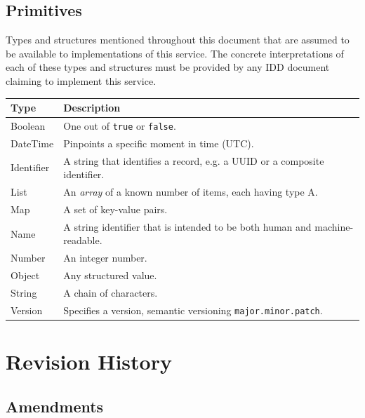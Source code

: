 \documentclass[a4paper]{arrowhead}
\newcommand{\pdef}[1]{{\textcolor{ArrowheadGrey}{#1\label{sec:model:primitives:#1}\label{sec:model:primitives:#1s}\label{sec:model:primitives:#1es}}}}
\begin{document}
\subsection{Primitives}
\label{sec:model:primitives}

Types and structures mentioned throughout this document that are assumed to be available to implementations of this service.
The concrete interpretations of each of these types and structures must be provided by any IDD document claiming to implement this service.

\noindent\begin{tabularx}{\textwidth}{| p{4.6cm} | X |} \hline
\rowcolor{gray!33} Type & Description \\ \hline
\pdef{Boolean} & One out of \texttt{true} or \texttt{false}. \\ \hline
\pdef{DateTime} & Pinpoints a specific moment in time (UTC). \\ \hline
\pdef{Identifier} & A string that identifies a record, e.g. a UUID or a composite identifier. \\ \hline
\pdef{List} & An \textit{array} of a known number of items, each having type A. \\ \hline
\pdef{Map} & A set of key-value pairs. \\ \hline
\pdef{Name} & A string identifier that is intended to be both human and machine-readable. \\ \hline
\pdef{Number} & An integer number. \\ \hline
\pdef{Object} & Any structured value. \\ \hline
\pdef{String} & A chain of characters. \\ \hline
\pdef{Version} & Specifies a version, semantic versioning \texttt{major.minor.patch}. \\ \hline
\end{tabularx}

\newpage




\newpage

\section{Revision History}
\subsection{Amendments}
\end{document}
